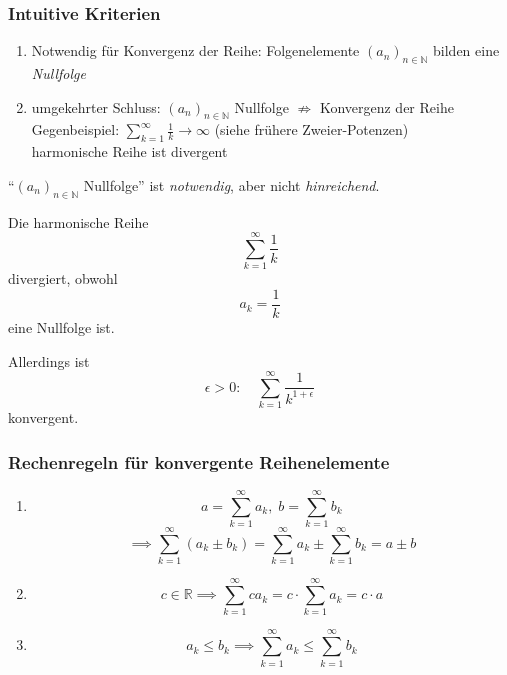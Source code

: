 \subsubsection*{Intuitive Kriterien}

\begin{enumerate}
    \item Notwendig für Konvergenz der Reihe: Folgenelemente $(a_n)_{n \in \mathbb{N}}$ bilden eine \emph{Nullfolge}
    \item umgekehrter Schluss: $(a_n)_{n \in \mathbb{N}}$ Nullfolge $\not\Rightarrow$ Konvergenz der Reihe\\
        Gegenbeispiel: $\sum_{k=1}^{\infty} \frac{1}{k} \rightarrow \infty $ (siehe frühere Zweier-Potenzen) \\
        harmonische Reihe ist divergent
\end{enumerate}

\begin{note}
    "`$(a_n)_{n \in \mathbb{N}}$ Nullfolge"' ist \emph{notwendig}, aber nicht \emph{hinreichend}.
\end{note}

\begin{example} Die harmonische Reihe
  \[ \sum_{k=1}^{\infty} \frac{1}{k} \]
  divergiert, obwohl
  \[ a_k = \frac{1}{k} \] eine Nullfolge ist.
\end{example}

\begin{note} Allerdings ist
    \[ \epsilon > 0: \quad \sum_{k=1}^{\infty} \frac{1}{k^{1+\epsilon}} \]
    konvergent.
\end{note}

\subsubsection*{Rechenregeln für konvergente Reihenelemente}
\begin{enumerate}
    \item \begin{equation*} a = \sum_{k=1}^{\infty} a_k,\; b = \sum_{k=1}^{\infty} b_k \end{equation*}
        \begin{equation*}\implies \sum_{k = 1}^{\infty} \left( a_k \pm b_k \right) = \sum_{k=1}^{\infty} a_k \pm \sum_{k=1}^{\infty} b_k = a \pm b
        \end{equation*}
    \item \begin{equation*}c \in \mathbb{R} \implies \sum_{k=1}^{\infty} c a_k = c \cdot\sum_{k=1}^{\infty} a_k = c \cdot a \end{equation*}
    \item \begin{equation*}a_k \leq b_k \implies \sum_{k=1}^{\infty} a_k \leq \sum_{k=1}^{\infty} b_k \end{equation*}
\end{enumerate}


